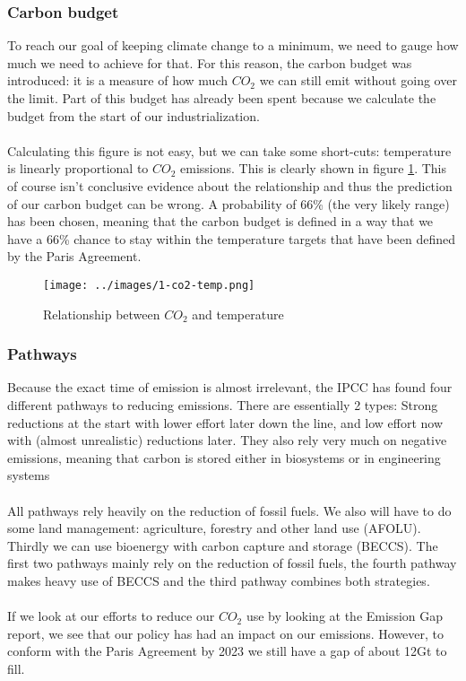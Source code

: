 \documentclass[../summary.tex]{subfiles}
\begin{document}
			\newpage
			\subsubsection{Carbon budget}
				To reach our goal of keeping climate change to a minimum, we need to gauge how much we need to achieve for that. For this reason, the carbon budget was introduced: it is a measure of how much $CO_2$ we can still emit without going over the limit. Part of this budget has already been spent because we calculate the budget from the start of our industrialization. \\
				\\
				Calculating this figure is not easy, but we can take some short-cuts: temperature is linearly proportional to $CO_2$ emissions. This is clearly shown in figure \ref{fig:1-co2-temp}. This of course isn't conclusive evidence about the relationship and thus the prediction of our carbon budget can be wrong. A probability of 66\% (the very likely range) has been chosen, meaning that the carbon budget is defined in a way that we have a 66\% chance to stay within the temperature targets that have been defined by the Paris Agreement.
				\begin{figure}[h]
					\centering
					\texttt{[image: ../images/1-co2-temp.png]}
					\caption{Relationship between $CO_2$ and temperature}
					\label{fig:1-co2-temp}
				\end{figure}
				
			\subsubsection{Pathways}
				Because the exact time of emission is almost irrelevant, the IPCC has found four different pathways to reducing emissions. There are essentially 2 types: Strong reductions at the start with lower effort later down the line, and low effort now with (almost unrealistic) reductions later. They also rely very much on negative emissions, meaning that carbon is stored either in biosystems or in engineering systems\\
				\\
				All pathways rely heavily on the reduction of fossil fuels. We also will have to do some land management: agriculture, forestry and other land use (AFOLU). Thirdly we can use bioenergy with carbon capture and storage (BECCS). The first two pathways mainly rely on the reduction of fossil fuels, the fourth pathway makes heavy use of BECCS and the third pathway combines both strategies. \\
				\\
				If we look at our efforts to reduce our $CO_2$ use by looking at the Emission Gap report, we see that our policy has had an impact on our emissions. However, to conform with the Paris Agreement by 2023 we still have a gap of about 12Gt to fill. %
		
\end{document}
